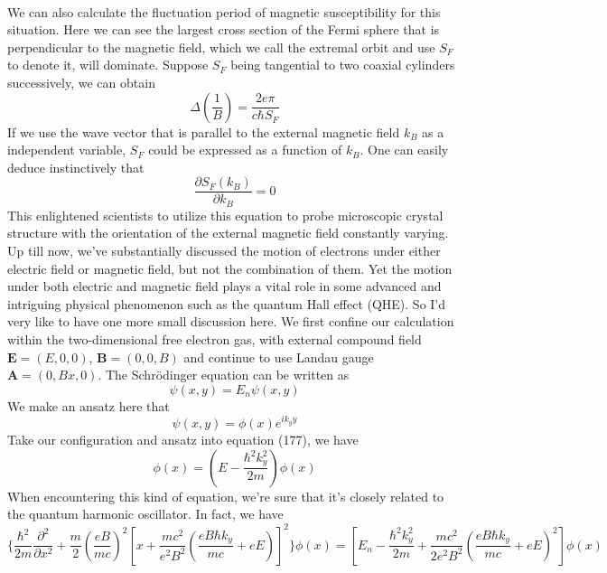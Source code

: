 \documentclass{article}
\begin{document}
\\
We can also calculate the fluctuation period of magnetic susceptibility for this situation. Here we can see the largest cross section of the Fermi sphere that is perpendicular to the magnetic field, which we call the extremal orbit and use $S_F$ to denote it, will dominate. Suppose $S_F$ being tangential to two coaxial cylinders successively, we can obtain\begin{equation}
    \Delta(\frac{1}{B})=\frac{2e\pi}{c\hbar{S_F}}
\end{equation}If we use the wave vector that is parallel to the external magnetic field $k_B$ as a independent variable, $S_F$ could be expressed as a function of $k_B$. One can easily deduce instinctively that\begin{equation}
    \frac{\partial{S_F}(k_B)}{\partial{k_B}}=0
\end{equation}This enlightened scientists to utilize this equation to probe microscopic crystal structure with the orientation of the external magnetic field constantly varying. Up till now, we've substantially discussed the motion of electrons under either electric field or magnetic field, but not the combination of them. Yet the motion under both electric and magnetic field plays a vital role in some advanced and intriguing physical phenomenon such as the quantum Hall effect (QHE). So I'd very like to have one more small discussion here. We first confine our calculation within the two-dimensional free electron gas, with external compound field $\mathbf{E}=(E,0,0)$, $\mathbf{B}=(0,0,B)$ and continue to use Landau gauge $\mathbf{A}=(0,Bx,0)$. The Schr\"odinger equation can be written as\begin{equation}
    [\frac{1}{2m}(\mathbf{p}+\frac{e}{c}\mathbf{A})^2+eEx]\psi(x,y)=E_n\psi(x,y)
\end{equation}We make an ansatz here that\begin{equation}
    \psi(x,y)=\phi(x)e^{ik_yy}
\end{equation}Take our configuration and ansatz into equation (177), we have\begin{equation}
    [-\frac{\hbar^2}{2m}\frac{\partial^2}{\partial{x}^2}+(\frac{eB\hbar{k_y}}{mc}+eE)x+\frac{e^2B^2}{2mc^2}x^2]\phi(x)=(E-\frac{\hbar^2k_y^2}{2m})\phi(x)
\end{equation}When encountering this kind of equation, we're sure that it's closely related to the quantum harmonic oscillator. In fact, we have\begin{equation}
    \{\frac{\hbar^2}{2m}\frac{\partial^2}{\partial{x^2}}+\frac{m}{2}(\frac{eB}{mc})^2[x+\frac{mc^2}{e^2B^2}(\frac{eB\hbar{k_y}}{mc}+eE)]^2\}\phi(x)=[E_n-\frac{\hbar^2k_y^2}{2m}+\frac{mc^2}{2e^2B^2}(\frac{eB\hbar{k_y}}{mc}+eE)^2]\phi(x)

\end{equation}
\end{document}

